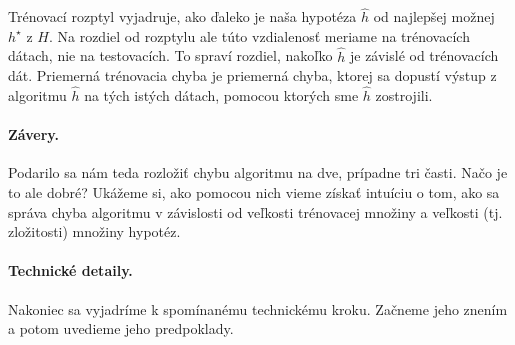 Trénovací rozptyl vyjadruje, ako ďaleko je naša hypotéza $\hat{h}$
od najlepšej možnej $h^\star$ z $H$. Na rozdiel od rozptylu ale túto
vzdialenosť meriame na trénovacích dátach, nie na testovacích. To spraví
rozdiel, nakoľko $\hat{h}$ je závislé od trénovacích dát.
Priemerná trénovacia chyba je priemerná chyba, ktorej sa dopustí výstup
z algoritmu $\hat{h}$ na tých istých dátach, pomocou ktorých sme $\hat{h}$
zostrojili.


\paragraph{Závery.}
Podarilo sa nám teda rozložiť chybu algoritmu na dve, prípadne tri časti.
Načo je to ale dobré? Ukážeme si, ako pomocou nich vieme získať intuíciu
o tom, ako sa správa chyba algoritmu v závislosti od veľkosti trénovacej
množiny a veľkosti (tj. zložitosti) množiny hypotéz.



\paragraph{Technické detaily.}
Nakoniec sa vyjadríme k spomínanému technickému kroku. Začneme jeho
znením a potom uvedieme jeho predpoklady.

